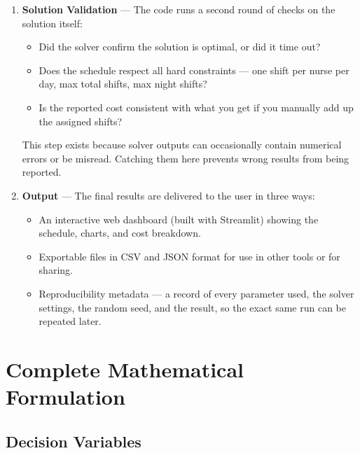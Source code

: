 \documentclass[12pt,a4paper]{article}
\begin{document}
\begin{enumerate}[leftmargin=20pt, itemsep=8pt,
    label=\colorbox{navyblue}{\color{white}\small\bfseries\arabic*.}]
  \item \textbf{Solution Validation} — The code runs a second round of checks on the solution itself:
    \begin{itemize}[itemsep=3pt]
      \item Did the solver confirm the solution is optimal, or did it time out?
      \item Does the schedule respect all hard constraints — one shift per nurse per day, max total shifts, max night shifts?
      \item Is the reported cost consistent with what you get if you manually add up the assigned shifts?
    \end{itemize}
    This step exists because solver outputs can occasionally contain numerical errors or be misread. Catching them here prevents wrong results from being reported.

  \item \textbf{Output} — The final results are delivered to the user in three ways:
    \begin{itemize}[itemsep=3pt]
      \item An interactive web dashboard (built with Streamlit) showing the schedule, charts, and cost breakdown.
      \item Exportable files in CSV and JSON format for use in other tools or for sharing.
      \item Reproducibility metadata — a record of every parameter used, the solver settings, the random seed, and the result, so the exact same run can be repeated later.
    \end{itemize}

\end{enumerate}

\newpage
\section{Complete Mathematical Formulation}

\subsection{Decision Variables}
\end{document}
